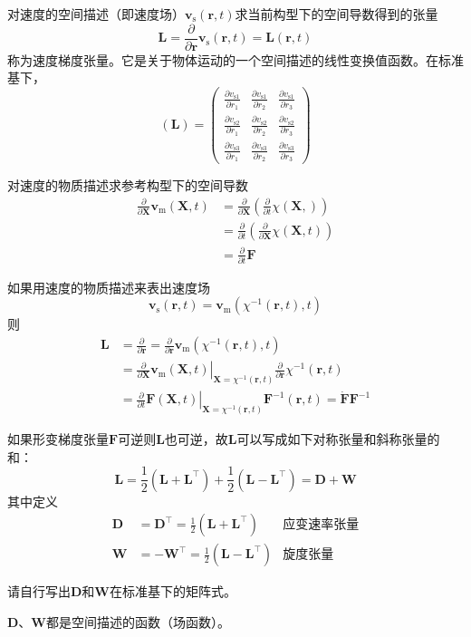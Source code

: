 \documentclass[main.tex]{subfiles}
\begin{document}
对速度的空间描述（即速度场）$\mathbf{v}_\mathrm{s}\left(\mathbf{r},t\right)$求当前构型下的空间导数得到的张量
\[\mathbf{L}=\frac{\partial}{\partial\mathbf{r}}\mathbf{v}_\mathrm{s}\left(\mathbf{r},t\right)=\mathbf{L}\left(\mathbf{r},t\right)\]
称为速度梯度张量。它是关于物体运动的一个空间描述的线性变换值函数。在标准基下，
\[\left(\mathbf{L}\right)=\left(\begin{array}{ccc}\frac{\partial v_{\mathrm{s}1}}{\partial r_1}&\frac{\partial v_{\mathrm{s}1}}{\partial r_2}&\frac{\partial v_{\mathrm{s}1}}{\partial r_3}\\\frac{\partial v_{\mathrm{s}2}}{\partial r_1}&\frac{\partial v_{\mathrm{s}2}}{\partial r_2}&\frac{\partial v_{\mathrm{s}2}}{\partial r_3}\\\frac{\partial v_{\mathrm{s}3}}{\partial r_1}&\frac{\partial v_{\mathrm{s}3}}{\partial r_2}&\frac{\partial v_{\mathrm{s}3}}{\partial r_3}\end{array}\right)\]

对速度的物质描述求参考构型下的空间导数
\begin{align*}\frac{\partial}{\partial\mathbf{X}}\mathbf{v}_\mathrm{m}\left(\mathbf{X},t\right)&=\frac{\partial}{\partial \mathbf{X}}\left(\frac{\partial}{\partial t}\chi\left(\mathbf{X},\right)\right)\\
&=\frac{\partial}{\partial t}\left(\frac{\partial}{\partial\mathbf{X}}\chi\left(\mathbf{X},t\right)\right)\\
&=\frac{\partial}{\partial t}\mathbf{F}
\end{align*}

如果用速度的物质描述来表出速度场
\[\mathbf{v}_\mathrm{s}\left(\mathbf{r},t\right)=\mathbf{v}_\mathrm{m}\left(\chi^{-1}\left(\mathbf{r},t\right),t\right)\]
则
\begin{align*}
    \mathbf{L}&=\frac{\partial}{\partial\mathbf{r}}=\frac{\partial}{\partial \mathbf{r}}\mathbf{v}_\mathrm{m}\left(\chi^{-1}\left(\mathbf{r},t\right),t\right)\\
    &=\left.\frac{\partial}{\partial\mathbf{X}}\mathbf{v}_\mathrm{m}\left(\mathbf{X},t\right)\right|_{\mathbf{X}=\chi^{-1}\left(\mathbf{r},t\right)}\frac{\partial}{\partial \mathbf{r}}\chi^{-1}\left(\mathbf{r},t\right)\\
    &=\left.\frac{\partial}{\partial t}\mathbf{F}\left(\mathbf{X},t\right)\right|_{\mathbf{X}=\chi^{-1}\left(\mathbf{r},t\right)}\mathbf{F}^{-1}\left(\mathbf{r},t\right)=\dot{\mathbf{F}}\mathbf{F}^{-1}
\end{align*}

如果形变梯度张量$\mathbf{F}$可逆则$\mathbf{L}$也可逆，故$\mathbf{L}$可以写成如下对称张量和斜称张量的和：
\[\mathbf{L}=\frac{1}{2}\left(\mathbf{L}+\mathbf{L}^\intercal\right)+\frac{1}{2}\left(\mathbf{L}-\mathbf{L}^\intercal\right)=\mathbf{D}+\mathbf{W}\]
其中定义
\begin{align*}
    \mathbf{D}&=\mathbf{D}^\intercal=\frac{1}{2}\left(\mathbf{L}+\mathbf{L}^\intercal\right)&\text{应变速率张量}\\
    \mathbf{W}&=-\mathbf{W}^\intercal=\frac{1}{2}\left(\mathbf{L}-\mathbf{L}^\intercal\right)&\text{旋度张量}
\end{align*}

\begin{example}
请自行写出$\mathbf{D}$和$\mathbf{W}$在标准基下的矩阵式。
\end{example}

$\mathbf{D}$、$\mathbf{W}$都是空间描述的函数（场函数）。
\end{document}
